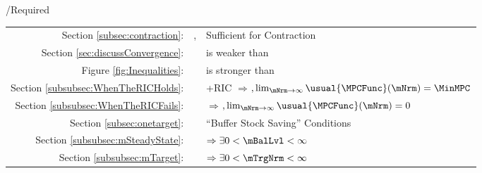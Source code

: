 \documentclass[\econtexRoot/BufferStockTheory]{subfiles}
\begin{document}
\begin{verbatimwrite}{\TableDir/Required}
\begin{table}
{\begin{tabular}{|l|l|l|}
  \\ \cline{2-3}\multicolumn{1}{|r|}{Section \ref{subsec:contraction}:}                            & \FVAC, \WRIC                      & Sufficient for Contraction
 \\ \multicolumn{1}{|r|}{Section \ref{sec:discussConvergence}:}                               &                      & \WRIC is weaker than \RIC 
\\  \multicolumn{1}{|r|}{Figure \ref{fig:Inequalities}:}                                        &                                 & \FVAC is stronger than \PFFVAC 
  \\ \multicolumn{1}{|r|}{Section \ref{subsubsec:WhenTheRICHolds}:}
                                            &                                 & \cncl{\FHWC}+RIC $\Rightarrow $\GIC$, \lim_{\mNrm \rightarrow \infty} \usual{\MPCFunc}(\mNrm)=\MinMPC$
  \\  \multicolumn{1}{|r|}{Section \ref{subsubsec:WhenTheRICFails}:}                                        &                                 & \cncl{\RIC}  $\Rightarrow $\cncl{\FHWC}$, \lim_{\mNrm \rightarrow \infty} \usual{\MPCFunc}(\mNrm)=0$
  \\ \cline{3-3}\multicolumn{1}{|r|}{Section \ref{subsec:onetarget}:}                                        &                                 & ``Buffer Stock Saving'' Conditions
  \\ \multicolumn{1}{|r|}{Section \ref{subsubsec:mSteadyState}:}                                        &                                 & \phantom{-Nrm}{\GIC} $\Rightarrow \exists 0 < \mBalLvl < \infty$ %
  \\ \multicolumn{1}{|r|}{Section \ref{subsubsec:mTarget}:}                                        &                                 & {\GICNrm} $\Rightarrow \exists 0 < \mTrgNrm < \infty$ %
                                                                                  

\end{tabular}}
\end{table}
\end{verbatimwrite}
\end{document}
